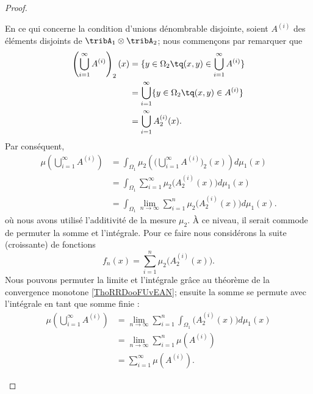 \begin{proof}
\begin{subproof}
    En ce qui concerne la condition d'unions dénombrable disjointe, soient \( A^{(i)}\) des éléments disjoints de \( \tribA_1\otimes \tribA_2\); nous commençons par remarquer que
    \begin{subequations}
        \begin{align}
            \left( \bigcup_{i=1}^{\infty}A^{(i)} \right)_2(x)&=\{ y\in\Omega_2\tq (x,y)\in\bigcup_{i=1}^{\infty}A^{(i)} \}\\
            &=\bigcup_{i=1}^{\infty}\{ y\in\Omega_2\tq (x,y)\in A^{(i)} \}\\
            &=\bigcup_{i=1}^{\infty}A^{(i)}_2(x).
        \end{align}
    \end{subequations}
    Par conséquent,
    \begin{subequations}
        \begin{align}
            \mu\left( \bigcup_{i=1}^{\infty}A^{(i)} \right)&=\int_{\Omega_1}\mu_2\left(    \Big( \bigcup_{i=1}^{\infty}A^{(i)} \Big)_2(x)     \right)d\mu_1(x)\\
            &=\int_{\Omega_1}\sum_{i=1}^{\infty}\mu_2\big( A^{(i)}_2(x) \big)d\mu_1(x)\\
            &=\int_{\Omega_1}\lim_{n\to \infty} \sum_{i=1}^{n}\mu_2\big( A^{(i)}_2(x) \big)d\mu_1(x).
        \end{align}
    \end{subequations}
    où nous avons utilisé l'additivité de la mesure \( \mu_2\). À ce niveau, il serait commode de permuter la somme et l'intégrale. Pour ce faire nous considérons la suite (croissante) de fonctions
    \begin{equation}
        f_n(x)=\sum_{i=1}^n\mu_2\big( A_2^{(i)}(x) \big).
    \end{equation}
    Nous pouvons permuter la limite et l'intégrale grâce au théorème de la convergence monotone \ref{ThoRRDooFUvEAN}; ensuite la somme se permute avec l'intégrale en tant que somme finie :
    \begin{subequations}
        \begin{align}
            \mu\left( \bigcup_{i=1}^{\infty}A^{(i)} \right)&=\lim_{n\to \infty} \sum_{i=1}^n\int_{\Omega_1}\big( A_2^{(i)}(x) \big)d\mu_1(x)\\
            &=\lim_{n\to \infty} \sum_{i=1}^n\mu(A^{(i)})\\
            &=\sum_{i=1}^{\infty}\mu( A^{(i)} ).
        \end{align}
    \end{subequations}


\end{subproof}
\end{proof}

